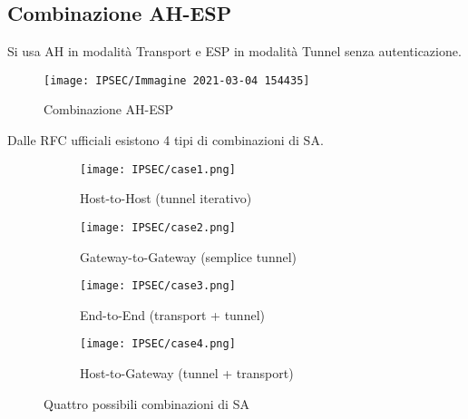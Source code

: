 \documentclass[14pt]{extreport}
\begin{document}
\subsection{Combinazione AH-ESP}

Si usa AH in modalità Transport e ESP in modalità Tunnel senza autenticazione.

\begin{figure}[H]
    \centering
    \texttt{[image: IPSEC/Immagine 2021-03-04 154435]}
    \caption{Combinazione AH-ESP}
    \label{IPSEC15}
\end{figure}


Dalle RFC ufficiali esistono 4 tipi di combinazioni di SA. 

\begin{figure}[H]
     \centering
     \begin{subfigure}[b]{0.45\textwidth}
         \centering
         \texttt{[image: IPSEC/case1.png]}
         \caption{Host-to-Host (tunnel iterativo)}
         
     \end{subfigure}
    \hfill
     \begin{subfigure}[b]{0.45\textwidth}
         \centering
         \texttt{[image: IPSEC/case2.png]}
         \caption{Gateway-to-Gateway (semplice tunnel)}
         
     \end{subfigure}
     
     \begin{subfigure}[b]{0.45\textwidth}
         \centering
         \texttt{[image: IPSEC/case3.png]}
         \caption{End-to-End (transport + tunnel)}
         
     \end{subfigure}
     \hfill
     \begin{subfigure}[b]{0.45\textwidth}
         \centering
         \texttt{[image: IPSEC/case4.png]}
         \caption{Host-to-Gateway (tunnel + transport)}
         
     \end{subfigure}
        \caption{Quattro possibili combinazioni di SA}
        
\end{figure}
\end{document}
